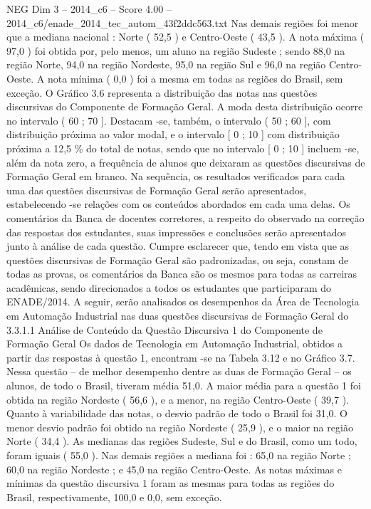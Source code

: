 \begin{textsample}{NEG Dim 3 – 2014\_c6 – Score 4.00 – 2014\_c6/enade\_2014\_tec\_autom\_43f2ddc563.txt}
Nas demais regiões foi menor que a mediana nacional : Norte ( 52,5 ) e Centro-Oeste ( 43,5 ).
A nota máxima ( 97,0 ) foi obtida por, pelo menos, um aluno na região Sudeste ; sendo 88,0 na região Norte, 94,0 na região Nordeste, 95,0 na região Sul e 96,0 na região Centro-Oeste.
A nota mínima ( 0,0 ) foi a mesma em todas as regiões do Brasil, sem exceção.
O Gráfico 3.6 representa a distribuição das notas nas questões discursivas do Componente de Formação Geral.
A moda desta distribuição ocorre no intervalo ( 60 ; 70 ].
Destacam -se, também, o intervalo ( 50 ; 60 ], com distribuição próxima ao valor modal, e o intervalo [ 0 ; 10 ] com distribuição próxima a 12,5 \% do total de notas, sendo que no intervalo [ 0 ; 10 ] incluem -se, além da nota zero, a frequência de alunos que deixaram as questões discursivas de Formação Geral em branco.
Na sequência, os resultados verificados para cada uma das questões discursivas de Formação Geral serão apresentados, estabelecendo -se relações com os conteúdos abordados em cada uma delas.
Os comentários da Banca de docentes corretores, a respeito do observado na correção das respostas dos estudantes, suas impressões e conclusões serão apresentados junto à análise de cada questão.
Cumpre esclarecer que, tendo em vista que as questões discursivas de Formação Geral são padronizadas, ou seja, constam de todas as provas, os comentários da Banca são os mesmos para todas as carreiras acadêmicas, sendo direcionados a todos os estudantes que participaram do ENADE/2014.
A seguir, serão analisados os desempenhos da Área de Tecnologia em Automação Industrial nas duas questões discursivas de Formação Geral do 3.3.1.1 Análise de Conteúdo da Questão Discursiva 1 do Componente de Formação Geral Os dados de Tecnologia em Automação Industrial, obtidos a partir das respostas à questão 1, encontram -se na Tabela 3.12 e no Gráfico 3.7.
Nessa questão – de melhor desempenho dentre as duas de Formação Geral – os alunos, de todo o Brasil, tiveram média 51,0.
A maior média para a questão 1 foi obtida na região Nordeste ( 56,6 ), e a menor, na região Centro-Oeste ( 39,7 ).
Quanto à variabilidade das notas, o desvio padrão de todo o Brasil foi 31,0.
O menor desvio padrão foi obtido na região Nordeste ( 25,9 ), e o maior na região Norte ( 34,4 ).
As medianas das regiões Sudeste, Sul e do Brasil, como um todo, foram iguais ( 55,0 ).
Nas demais regiões a mediana foi : 65,0 na região Norte ; 60,0 na região Nordeste ; e 45,0 na região Centro-Oeste.
As notas máximas e mínimas da questão discursiva 1 foram as mesmas para todas as regiões do Brasil, respectivamente, 100,0 e 0,0, sem exceção.

\end{textsample}
